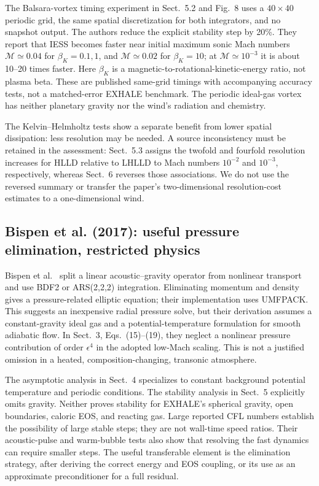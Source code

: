 \documentclass[english,a4paper]{my_memo}
\begin{document}
The Balsara-vortex timing experiment in Sect.~5.2 and Fig.~8 uses a $40\times40$ periodic grid, the same spatial discretization for both integrators, and no snapshot output. The authors reduce the explicit stability step by 20\%. They report that IESS becomes faster near initial maximum sonic Mach numbers $\mathcal M\simeq0.04$ for $\beta_K=0.1,1$, and $\mathcal M\simeq0.02$ for $\beta_K=10$; at $\mathcal M\simeq10^{-3}$ it is about 10--20 times faster. Here $\beta_K$ is a magnetic-to-rotational-kinetic-energy ratio, not plasma beta. These are published same-grid timings with accompanying accuracy tests, not a matched-error EXHALE benchmark. The periodic ideal-gas vortex has neither planetary gravity nor the wind's radiation and chemistry.

The Kelvin--Helmholtz tests show a separate benefit from lower spatial dissipation: less resolution may be needed. A source inconsistency must be retained in the assessment: Sect.~5.3 assigns the twofold and fourfold resolution increases for HLLD relative to LHLLD to Mach numbers $10^{-2}$ and $10^{-3}$, respectively, whereas Sect.~6 reverses those associations. We do not use the reversed summary or transfer the paper's two-dimensional resolution-cost estimates to a one-dimensional wind. 

\subsection{Bispen et al. (2017): useful pressure elimination, restricted physics}
Bispen et al.\ \cite{bispen} split a linear acoustic--gravity operator from nonlinear transport and use BDF2 or ARS(2,2,2) integration. Eliminating momentum and density gives a pressure-related elliptic equation; their implementation uses UMFPACK. This suggests an inexpensive radial pressure solve, but their derivation assumes a constant-gravity ideal gas and a potential-temperature formulation for smooth adiabatic flow. In Sect.~3, Eqs.~(15)--(19), they neglect a nonlinear pressure contribution of order $\epsilon^4$ in the adopted low-Mach scaling. This is not a justified omission in a heated, composition-changing, transonic atmosphere.

The asymptotic analysis in Sect.~4 specializes to constant background potential temperature and periodic conditions. The stability analysis in Sect.~5 explicitly omits gravity. Neither proves stability for EXHALE's spherical gravity, open boundaries, caloric EOS, and reacting gas. Large reported CFL numbers establish the possibility of large stable steps; they are not wall-time speed ratios. Their acoustic-pulse and warm-bubble tests also show that resolving the fast dynamics can require smaller steps. The useful transferable element is the elimination strategy, after deriving the correct energy and EOS coupling, or its use as an approximate preconditioner for a full residual.
\end{document}
